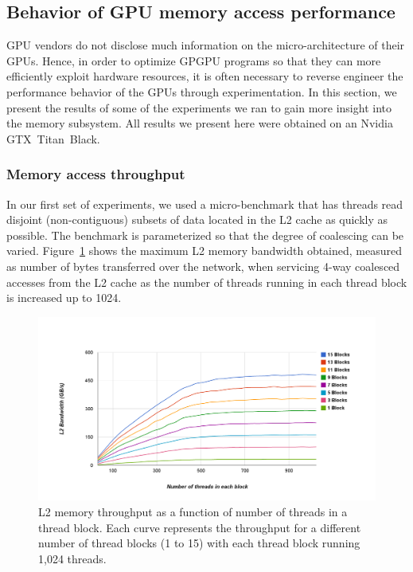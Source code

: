 \subsection{Behavior of GPU memory access performance}  \label{GPUBehavior}

GPU vendors do not disclose much information on the micro-architecture of their GPUs.
Hence, in order to optimize GPGPU programs so that they can more efficiently exploit hardware
resources, it is often necessary to reverse engineer the performance behavior of the GPUs through
experimentation.
In this section, we present the results of some of the experiments we ran to gain more insight into the memory subsystem.
All results we present here were obtained on an Nvidia GTX~Titan~Black.


\subsubsection{Memory access throughput}
In our first set of experiments, we used a micro-benchmark that has threads read disjoint (non-contiguous) subsets of data
located in the L2 cache as quickly as possible.
The benchmark is parameterized so that the degree of coalescing can be varied.
Figure~\ref{fig:MemBandwidth} shows the maximum L2 memory bandwidth obtained, measured as
number of bytes transferred over the network, when servicing 4-way coalesced
accesses from the L2 cache as the number of threads running in each thread block is increased up to
1024.



\begin{figure}
\center
\includegraphics[scale=0.21]{AllInL2MultipleSM4WayColaesced.png}
\caption{\footnotesize\textnormal{L2 memory throughput as a function of number of threads in a thread block. Each curve represents the throughput for a different number of thread blocks (1 to 15) with each thread block running 1,024 threads.}}
\label{fig:MemBandwidth}
\end{figure}

